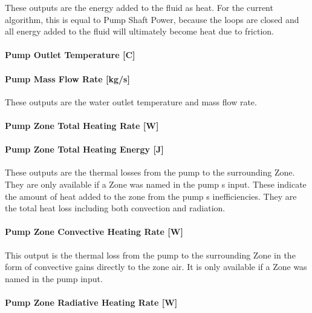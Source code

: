 These outputs are the energy added to the fluid as heat. For the current algorithm, this is equal to Pump Shaft Power, because the loops are closed and all energy added to the fluid will ultimately become heat due to friction.

\paragraph{Pump Outlet Temperature {[}C{]}}\label{pump-outlet-temperature-c}

\paragraph{Pump Mass Flow Rate {[}kg/s{]}}\label{pump-mass-flow-rate-kgs}

These outputs are the water outlet temperature and mass flow rate.

\paragraph{Pump Zone Total Heating Rate {[}W{]}}\label{pump-zone-total-heating-rate-w}

\paragraph{Pump Zone Total Heating Energy {[}J{]}}\label{pump-zone-total-heating-energy-j}

These outputs are the thermal losses from the pump to the surrounding Zone. They are only available if a Zone was named in the pump s input. These indicate the amount of heat added to the zone from the pump s inefficiencies. They are the total heat loss including both convection and radiation.

\paragraph{Pump Zone Convective Heating Rate {[}W{]}}\label{pump-zone-convective-heating-rate-w}

This output is the thermal loss from the pump to the surrounding Zone in the form of convective gains directly to the zone air. It is only available if a Zone was named in the pump input.

\paragraph{Pump Zone Radiative Heating Rate {[}W{]}}\label{pump-zone-radiative-heating-rate-w}

